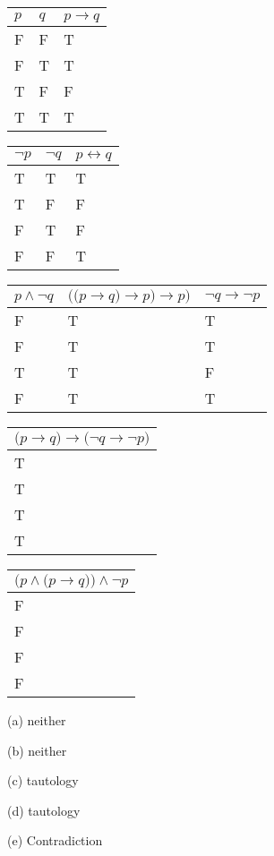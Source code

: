 \documentclass{article}
\begin{document}
\begin{tabular}{|l|l|l|}
  $p$ & $q$ & $p\rightarrow q$\\
  \hline
  F & F & T \\
  F & T & T \\
  T & F & F \\
  T & T & T
\end{tabular}
\begin{tabular}{l|l|l|}
  $\neg p$ & $\neg q$ & $p\leftrightarrow q$\\
  \hline
  T & T & T \\
  T & F & F \\
  F & T & F \\
  F & F & T
\end{tabular}
\begin{tabular}{l|l|l|}
 $p \wedge \neg q $ & $\big(\big( p \rightarrow q \big) \rightarrow p \big) \rightarrow p \big) $ & $ \neg q \rightarrow \neg p$\\
  \hline
  F & T & T \\
  F & T & T \\
  T & T & F \\
  F & T & T
\end{tabular}
\begin{tabular}{l|}
 $\big(p \rightarrow q \big) \rightarrow \big( \neg q \rightarrow \neg p \big) $\\
  \hline
  T \\
  T \\
  T \\
  T 
\end{tabular}


\begin{tabular}{|l|}
 $\big(p \wedge \big( p \rightarrow q \big) \big) \wedge \neg p$\\
  \hline
  F \\
  F \\
  F \\
  F 
\end{tabular}

(a) neither

(b) neither

(c) tautology

(d) tautology

(e) Contradiction
\end{document}
